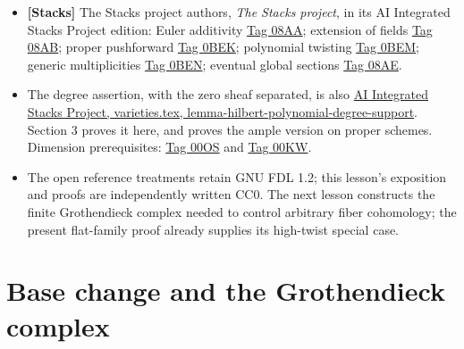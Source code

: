 \documentclass[11pt]{article}
\providecommand{\tightlist}{\setlength{\itemsep}{0pt}\setlength{\parskip}{0pt}}
\begin{document}
\begin{itemize}
\tightlist
\item
  \textbf{{[}Stacks{]}} The Stacks project authors, \emph{The Stacks
  project}, in its AI Integrated Stacks Project edition: Euler
  additivity
  \href{https://kokunoyumeto.github.io/stacks-zh-hans-cn/en/varieties.html\#varieties-lemma-euler-characteristic-additive}{Tag
  08AA}; extension of fields
  \href{https://kokunoyumeto.github.io/stacks-zh-hans-cn/en/varieties.html\#varieties-lemma-euler-characteristic-extend-base-field}{Tag
  08AB}; proper pushforward
  \href{https://kokunoyumeto.github.io/stacks-zh-hans-cn/en/varieties.html\#varieties-lemma-euler-characteristic-morphism}{Tag
  0BEK}; polynomial twisting
  \href{https://kokunoyumeto.github.io/stacks-zh-hans-cn/en/varieties.html\#varieties-lemma-numerical-polynomial-from-euler}{Tag
  0BEM}; generic multiplicities
  \href{https://kokunoyumeto.github.io/stacks-zh-hans-cn/en/varieties.html\#varieties-lemma-numerical-polynomial-leading-term}{Tag
  0BEN}; eventual global sections
  \href{https://kokunoyumeto.github.io/stacks-zh-hans-cn/en/varieties.html\#varieties-lemma-hilbert-polynomial-H0}{Tag
  08AE}.
\item
  The degree assertion, with the zero sheaf separated, is also
  \href{https://kokunoyumeto.github.io/stacks-zh-hans-cn/en/varieties.html\#varieties-lemma-hilbert-polynomial-degree-support}{AI
  Integrated Stacks Project, varieties.tex,
  lemma-hilbert-polynomial-degree-support}. Section 3 proves it here,
  and proves the ample version on proper schemes. Dimension
  prerequisites:
  \href{https://kokunoyumeto.github.io/stacks-zh-hans-cn/en/algebra.html\#algebra-lemma-dimension-spell-it-out}{Tag
  00OS} and
  \href{https://kokunoyumeto.github.io/stacks-zh-hans-cn/en/algebra.html\#algebra-lemma-one-equation}{Tag
  00KW}.
\item
  The open reference treatments retain GNU FDL 1.2; this lesson's
  exposition and proofs are independently written CC0. The next lesson
  constructs the finite Grothendieck complex needed to control arbitrary
  fiber cohomology; the present flat-family proof already supplies its
  high-twist special case.
\end{itemize}

\section{Base change and the Grothendieck
complex}\label{base-change-and-the-grothendieck-complex}
\end{document}
